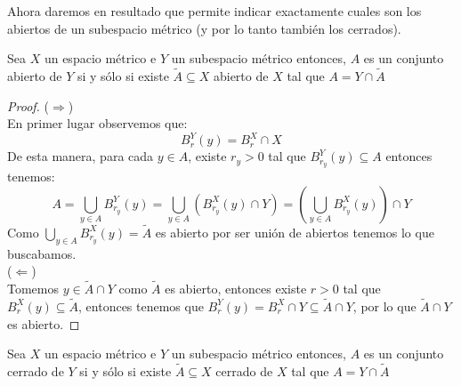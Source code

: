 \documentclass[12pt,a4paper]{book}
\begin{document}
Ahora daremos en resultado que permite indicar exactamente cuales son los abiertos de un subespacio métrico (y por lo tanto también los cerrados).
\begin{prop} Sea $X$ un espacio métrico e $Y$ un subespacio métrico entonces, $A$ es un conjunto abierto de $Y$ si y sólo si existe $\tilde{A}\subseteq X$ abierto de $X$ tal que $A = Y \cap \tilde{A}$
\begin{proof}
($\Rightarrow$)\\
En primer lugar observemos que:
$$B_r^Y(y) = B_r^X \cap X$$
De esta manera, para cada $y \in A$, existe $r_y>0$ tal que $B_{r_y}^Y(y) \subseteq A$ entonces tenemos:
$$ A = \bigcup_{y \in A} B_{r_y}^Y(y) = \bigcup_{y \in A} (B_{r_y}^X(y) \cap Y) = \left(\bigcup_{y \in A} B_{r_y}^X(y )\right) \cap Y$$
Como $\bigcup_{y \in A} B_{r_y}^X(y) = \tilde{A}$ es abierto por ser unión de abiertos tenemos lo que buscabamos.\\
($\Leftarrow$)\\
Tomemos $y \in \tilde{A} \cap Y$ como $\tilde{A}$ es abierto, entonces existe $r>0$ tal que $B_r^X(y) \subseteq \tilde{A}$, entonces tenemos que $B_r^Y(y) = B_r^X \cap Y \subseteq \tilde{A} \cap Y$, por lo que $\tilde{A} \cap Y$ es abierto.
\end{proof}
\end{prop}
\begin{cor} Sea $X$ un espacio métrico e $Y$ un subespacio métrico entonces, $A$ es un conjunto cerrado de $Y$ si y sólo si existe $\tilde{A}\subseteq X$ cerrado de $X$ tal que $A = Y \cap \tilde{A}$
\end{cor}

\ifx\isEmbedded\undefined
\end{document}
